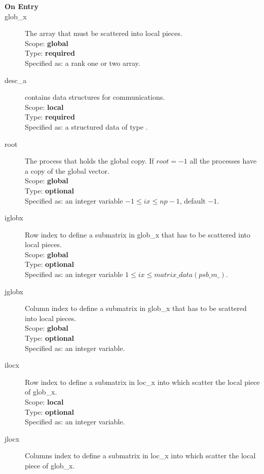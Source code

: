 
\begin{description}
\item[\bf On Entry]
\item[glob\_x] The array that must be scattered into local pieces.\\
Scope: {\bf global} \\
Type: {\bf required}\\
Specified as: a rank one or two array.
\item[desc\_a] contains data structures for communications.\\
Scope: {\bf local} \\
Type: {\bf required}\\
Specified as: a structured data of type \descdata.
\item[root]  The process that holds the global copy. If $root=-1$ all
  the processes have a copy of the global vector.\\
Scope: {\bf global} \\
Type: {\bf optional}\\
Specified as: an integer variable $-1\le ix\le np-1$, default $-1$. 
\item[iglobx]  Row index to define a submatrix in glob\_x that has to
  be scattered into local pieces.\\
Scope: {\bf global} \\
Type: {\bf optional}\\
Specified as: an integer variable $1\le ix\le matrix\_data(psb\_m\_)$. 
\item[jglobx]  Column index to define a submatrix in glob\_x that has to
  be scattered into local pieces.\\
Scope: {\bf global} \\
Type: {\bf optional}\\
Specified as: an integer variable. 
\item[ilocx]  Row index to define a submatrix in loc\_x into which
  scatter the local piece of glob\_x.\\
Scope: {\bf local} \\
Type: {\bf optional}\\
Specified as: an integer variable. 
\item[jlocx]  Columns index to define a submatrix in loc\_x into which
  scatter the local piece of glob\_x.\\

\end{description}
